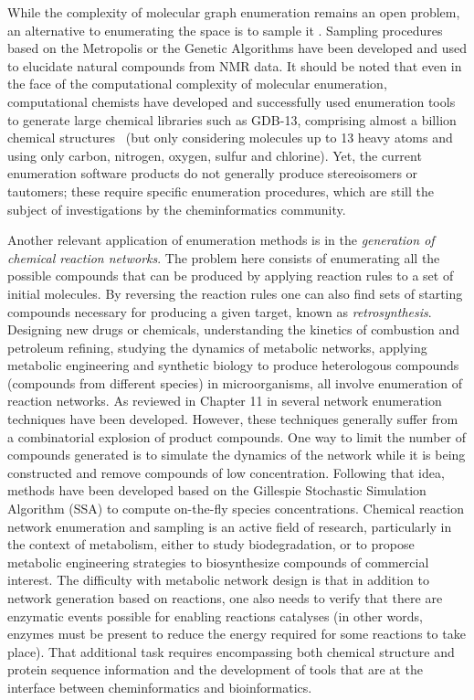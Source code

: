 \documentclass{sig-alternate}
\begin{document}
While the complexity of molecular graph enumeration remains an open
problem, an alternative to enumerating the space is to sample it
\cite{goldberg1999}. Sampling procedures based on the Metropolis or
the Genetic Algorithms have been developed and used to elucidate
natural compounds from NMR data. It should be noted that even in the
face of the computational complexity of molecular enumeration,
computational chemists have developed and successfully used
enumeration tools to generate large chemical libraries such as GDB-13,
comprising almost a billion chemical structures~\cite{GDB} (but only
considering molecules up to 13 heavy atoms and using only carbon, nitrogen, oxygen, sulfur
and chlorine). Yet, the current enumeration software products do not
generally produce stereoisomers or tautomers; these require specific
enumeration procedures, which are still the subject of investigations
by the cheminformatics community.

Another relevant application of enumeration methods is in the
\emph{generation of chemical reaction networks}. The problem here
consists of enumerating all the possible compounds that can be
produced by applying reaction rules to a set of initial molecules. By
reversing the reaction rules one can also find sets of starting
compounds necessary for producing a given target, known as
\emph{retrosynthesis}. Designing new drugs or chemicals, understanding
the kinetics of combustion and petroleum refining, studying the
dynamics of metabolic networks, applying metabolic engineering and
synthetic biology to produce heterologous compounds (compounds from different species) in microorganisms,
all involve enumeration of reaction networks. As reviewed in Chapter
11 in \cite{faulon2010} several network enumeration techniques have
been developed. However, these techniques generally suffer from a
combinatorial explosion of product compounds. One way to limit the
number of compounds generated is to simulate the dynamics of the
network while it is being constructed and remove compounds of low
concentration. Following that idea, methods have been developed based
on the Gillespie Stochastic Simulation Algorithm (SSA) to compute
on-the-fly species concentrations. Chemical reaction network
enumeration and sampling is an active field of research, particularly
in the context of metabolism, either to study biodegradation, or to
propose metabolic engineering strategies to biosynthesize compounds of
commercial interest. The difficulty with metabolic network design is
that in addition to network generation based on reactions, one also
needs to verify that there are enzymatic events possible for enabling
reactions catalyses (in other words, enzymes must be present to reduce the energy required for some reactions to take place). That additional task requires encompassing both
chemical structure and protein sequence information and the
development of tools that are at the interface between cheminformatics
and bioinformatics.
\end{document}
